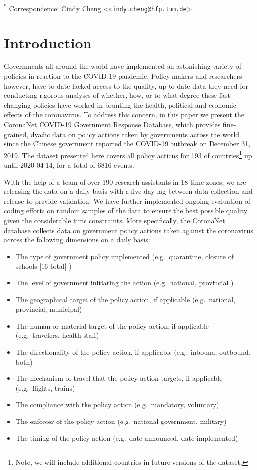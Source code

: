 \documentclass[]{article}
\providecommand{\tightlist}{%
  \setlength{\itemsep}{0pt}\setlength{\parskip}{0pt}}
\let\rmarkdownfootnote\footnote%
\def\footnote{\protect\rmarkdownfootnote}
\begin{document}
\textsuperscript{*} Correspondence: \href{mailto:cindy.cheng@hfp.tum.de}{Cindy Cheng \textless{}\href{mailto:cindy.cheng@hfp.tum.de}{\nolinkurl{cindy.cheng@hfp.tum.de}}\textgreater{}}

\hypertarget{introduction}{%
\section{Introduction}\label{introduction}}

Governments all around the world have implemented an astonishing variety of policies in reaction to the COVID-19 pandemic. Policy makers and researchers however, have to date lacked access to the quality, up-to-date data they need for conducting rigorous analyses of whether, how, or to what degree these fast changing policies have worked in brunting the health, political and economic effects of the coronavirus. To address this concern, in this paper we present the CoronaNet COVID-19 Government Response Database, which provides fine-grained, dyadic data on policy actions taken by governments across the world since the Chinese government reported the COVID-19 outbreak on December 31, 2019. The dataset presented here covers all policy actions for 193 of countries\footnote{Note, we will include additional countries in future versions of the dataset.} up until 2020-04-14, for a total of 6816 events.

With the help of a team of over 190 research assistants in 18 time zones, we are releasing the data on a daily basis with a five-day lag between data collection and release to provide validation. We have further implemented ongoing evaluation of coding efforts on random samples of the data to ensure the best possible quality given the considerable time constraints. More specifically, the CoronaNet database collects data on government policy actions taken against the coronavirus across the following dimensions on a daily basis:

\begin{itemize}
\tightlist
\item
  The type of government policy implemented (e.g.~quarantine, closure of schools {[}16 total{]} )
\item
  The level of government initiating the action (e.g.~national, provincial )
\item
  The geographical target of the policy action, if applicable (e.g.~national, provincial, municipal)
\item
  The human or material target of the policy action, if applicable (e.g.~travelers, health staff)
\item
  The directionality of the policy action, if applicable (e.g.~inbound, outbound, both)
\item
  The mechanism of travel that the policy action targets, if applicable (e.g.~flights, trains)
\item
  The compliance with the policy action (e.g.~mandatory, voluntary)
\item
  The enforcer of the policy action (e.g.~national government, military)
\item
  The timing of the policy action (e.g.~date announced, date implemented)
\end{itemize}
\end{document}
